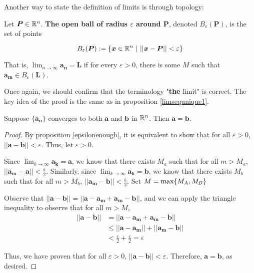 Another way to state the definition of limits is through topology:

\begin{definition}
    Let $\bm{P} \in \mathbb{R}^n$.  \textbf{The open ball of radius $\varepsilon$ around $\bm{P}$}, denoted $B_{\varepsilon}(\bm{P})$, is the set of points 
    
    $$B_{\varepsilon}(\bm{P}) := \{ \bm{x} \in \mathbb{R}^n \ | \ ||\bm{x} - \bm{P} || < \varepsilon\}$$
    
    \end{definition}

    That is, $\lim_{n\to\infty} \bm{a_n} = \bm{L}$ if for every $\varepsilon > 0$, there is some $M$ such that $\bm{a_m} \in B_{\varepsilon}(\bm{L})$.



Once again, we should confirm that the terminology "\textbf{the} limit" is correct.  The key idea of the proof is the same as in proposition \ref{limsequnique1}.

\begin{proposition}
    Suppose $\{\bm{a_n}\}$ converges to both $\bm{a}$ and $\bm{b}$ in $\mathbb{R}^n$.  Then $\bm{a} = \bm{b}$.
    \end{proposition}

\begin{proof}
By proposition \ref{epsilonenough}, it is equivalent to show that for all $\varepsilon > 0$, $||\bm{a}-\bm{b}|| < \varepsilon$.  Thus, let $\varepsilon > 0$.  

Since $\lim_{k \to \infty} \bm{a_k} = \bm{a}$, we know that there exists $M_a$ such that for all $m > M_a$, $||\bm{a_m} -\bm{a}|| < \frac{\varepsilon}{2}$. Similarly, since $\lim_{k\to \infty} \bm{a_k} = \bm{b}$, we know that there exists $M_b$ such that for all $m > M_b$, $||\bm{a_m} -\bm{b}|| < \frac{\varepsilon}{2}$.  Set $M = \textnormal{max}\{M_A, M_B\}$

Observe that $||\bm{a}-\bm{b}|| = ||\bm{a}-\bm{a_m}+\bm{a_m}-\bm{b}||$, and we can apply the triangle inequality to observe that for all $m > M$,
\begin{align*}
    ||\bm{a}-\bm{b}|| &= ||\bm{a}-\bm{a_m}+\bm{a_m}-\bm{b}|| \\
    & \leq ||\bm{a}-\bm{a_m}||+||\bm{a_m}-\bm{b}|| \\
    &< \frac{\varepsilon}{2} + \frac{\varepsilon}{2} = \varepsilon
\end{align*}

Thus, we have proven that for all $\varepsilon > 0$, $||\bm{a}-\bm{b}|| < \varepsilon$.  Therefore, $\bm{a} = \bm{b}$, as desired.

\end{proof}





